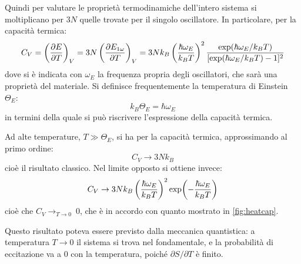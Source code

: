 Quindi per valutare le proprietà termodinamiche dell'intero sistema si moltiplicano per $ 3N $ quelle trovate per il singolo oscillatore. In particolare, per la capacità termica:
\begin{equation*}
	C_V = \left(\frac{\partial {E}}{\partial {T}}\right)_{V} = 3N \left(\frac{\partial {E_{1\omega}}}{\partial {T}}\right)_{V} = 3 N k_B \left(\frac{\hbar \omega_E}{k_B T}\right)^2 \frac{\exp(\hbar \omega_E/k_B T)}{[\exp( \hbar \omega_E/k_B T) - 1]^2}
\end{equation*}
dove si è indicata con $ \omega_E $ la frequenza propria degli oscillatori, che sarà una proprietà del materiale. Si definisce frequentemente la temperatura di Einstein $ \Theta_E $:
\begin{equation*}
	k_B \Theta_E = \hbar \omega_E
\end{equation*}
in termini della quale si può riscrivere l'espressione della capacità termica.

Ad alte temperature, $ T \gg \Theta_E $, si ha per la capacità termica, approssimando al primo ordine:
\begin{equation*}
	C_V \rightarrow 3N k_B
\end{equation*}
cioè il risultato classico.
Nel limite opposto si ottiene invece:
\begin{equation*}
C_V \rightarrow 3N k_B \left(\frac{\hbar \omega_E}{k_B T}\right)^2 \exp(-\frac{\hbar \omega_E}{k_B T})
\end{equation*}
cioè che $ C_V \rightarrow_{T \rightarrow 0} ~0 $, che è in accordo con quanto mostrato in \cref{fig:heatcap}.

Questo risultato poteva essere previsto dalla meccanica quantistica: a temperatura $ T \rightarrow 0 $ il sistema si trova nel fondamentale, e la probabilità di eccitazione va a $ 0 $ con la temperatura, poiché $ \partial S / \partial T $ è finito.
\newline

